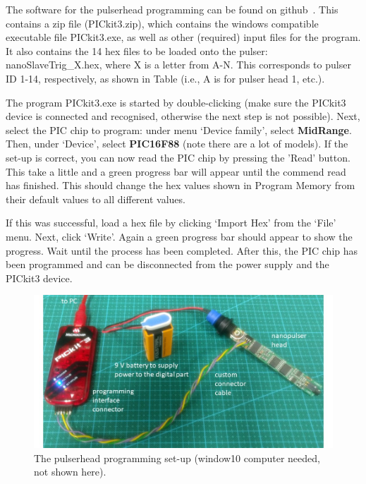 The software for the pulserhead programming can be found on github~\cite{GITHUB_PIC}. This contains a zip file (PICkit3.zip), which contains the windows compatible executable file PICkit3.exe, as well as other (required) input files for the program. It also contains the 14 hex files to be loaded onto the pulser: nanoSlaveTrig\_X.hex, where X is a letter from A-N. This corresponds to pulser ID 1-14, respectively, as shown in Table%
 (i.e., A is for pulser head 1, etc.).

The program PICkit3.exe is started by double-clicking (make sure the PICkit3 device is connected and recognised, otherwise the next step is not possible). Next, select the PIC chip to program: under menu `Device family', select {\bf MidRange}. Then, under `Device', select {\bf PIC16F88} (note there are a lot of models). If the set-up is correct, you can now read the PIC chip by pressing the 'Read' button. This take a little and a green progress bar will appear until the commend read has finished. This should change the hex values shown in Program Memory from their default values to all different values. 

If this was successful, load a hex file by clicking `Import Hex' from the `File' menu. Next, click `Write'. Again a green progress bar should appear to show the progress. Wait until the process has been completed. After this, the PIC chip has been programmed and can be disconnected from the power supply and the PICkit3 device.

\begin{figure}
\begin{center}	
  \includegraphics[width=1.0\linewidth]{figures/pulserhead_programming.jpg}
  \caption{The pulserhead programming set-up (window10 computer needed, not shown here).}
  \label{figure:pulserhead_programming}
\end{center}
\end{figure}

